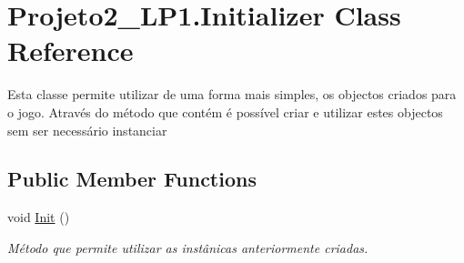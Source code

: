 \hypertarget{class_projeto2___l_p1_1_1_initializer}{}\section{Projeto2\+\_\+\+L\+P1.\+Initializer Class Reference}
\label{class_projeto2___l_p1_1_1_initializer}


Esta classe permite utilizar de uma forma mais simples, os objectos criados para o jogo. Através do método que contém é possível criar e utilizar estes objectos sem ser necessário instanciar  


\subsection*{Public Member Functions}
\begin{DoxyCompactItemize}
\item 
void \mbox{\hyperlink{class_projeto2___l_p1_1_1_initializer_a79569fa3984fb673f2d5751495970e64}{Init}} ()
\begin{DoxyCompactList}\small\item\em Método que permite utilizar as instânicas anteriormente criadas. \end{DoxyCompactList}\end{DoxyCompactItemize}

